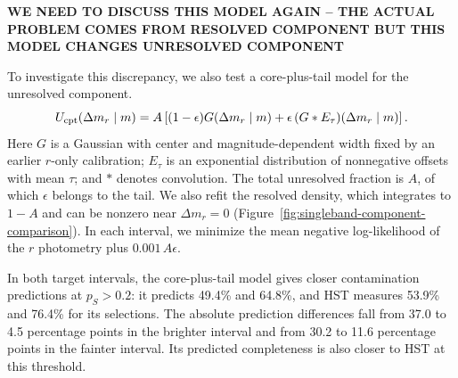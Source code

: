 {\bf WE NEED TO DISCUSS THIS MODEL AGAIN -- THE ACTUAL PROBLEM COMES
  FROM RESOLVED COMPONENT BUT THIS MODEL CHANGES UNRESOLVED COMPONENT}


To investigate this discrepancy, we also test a core-plus-tail model for the
unresolved component.
\begin{equation}
 U_{\rm cpt}(\Delta m_r\mid m)=A\left[(1-\epsilon)G(\Delta m_r\mid m)
                 +\epsilon\,(G*E_\tau)(\Delta m_r\mid m)\right].
 \label{eq:singleband-core-tail}
\end{equation}
Here $G$ is a Gaussian with center and magnitude-dependent width fixed by an
earlier $r$-only calibration; $E_\tau$ is an exponential distribution of
nonnegative offsets with mean $\tau$; and $*$ denotes convolution. The total
unresolved fraction is $A$, of which $\epsilon$ belongs to the tail. We also
refit the resolved density, which integrates to $1-A$ and can be nonzero near
$\Delta m_r=0$ (Figure~\ref{fig:singleband-component-comparison}). In each interval,
we minimize the mean negative log-likelihood of the $r$ photometry plus
$0.001\,A\epsilon$.

\begin{samepage}
In both target intervals, the core-plus-tail model gives closer
contamination predictions at $p_S>0.2$: it predicts 49.4\% and 64.8\%, and
HST measures 53.9\% and 76.4\% for its selections. The absolute prediction
differences fall from 37.0 to 4.5 percentage points in the brighter interval
and from 30.2 to 11.6 percentage points in the fainter interval. Its predicted
completeness is also closer to HST at this threshold.

\end{samepage}





